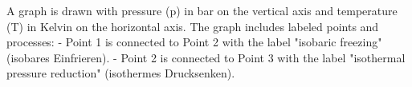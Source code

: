 A graph is drawn with pressure (p) in bar on the vertical axis and temperature (T) in Kelvin on the horizontal axis. The graph includes labeled points and processes:  
- Point 1 is connected to Point 2 with the label "isobaric freezing" (isobares Einfrieren).  
- Point 2 is connected to Point 3 with the label "isothermal pressure reduction" (isothermes Drucksenken).